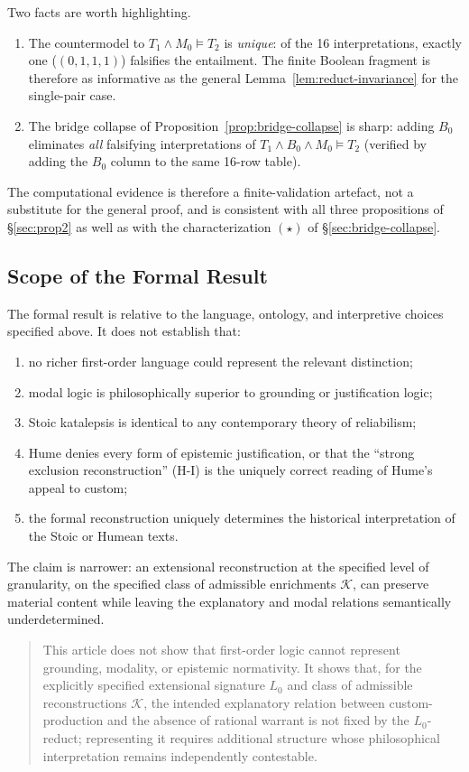 Two facts are worth highlighting.
\begin{enumerate}
\item The countermodel to $T_1\land M_0\models T_2$ is
\emph{unique}: of the 16 interpretations, exactly one
($(0,1,1,1)$) falsifies the entailment. The finite Boolean
fragment is therefore as informative as the general
Lemma~\ref{lem:reduct-invariance} for the single-pair case.
\item The bridge collapse of
Proposition~\ref{prop:bridge-collapse} is sharp: adding $B_0$
eliminates \emph{all} falsifying interpretations of
$T_1\land B_0\land M_0\models T_2$ (verified by adding the
$B_0$ column to the same 16-row table).
\end{enumerate}
The computational evidence is therefore a finite-validation
artefact, not a substitute for the general proof, and is consistent
with all three propositions of \S\ref{sec:prop2} as well as with the
characterization $(\star)$ of
\S\ref{sec:bridge-collapse}.

\subsection{Scope of the Formal Result}
\label{sec:formal-scope}

The formal result is relative to the language, ontology, and
interpretive choices specified above. It does not establish that:
\begin{enumerate}
\item no richer first-order language could represent the relevant
      distinction;
\item modal logic is philosophically superior to grounding or
      justification logic;
\item Stoic katalepsis is identical to any contemporary theory of
      reliabilism;
\item Hume denies every form of epistemic justification, or that
      the ``strong exclusion reconstruction'' (H-I) is the uniquely
      correct reading of Hume's appeal to custom;
\item the formal reconstruction uniquely determines the historical
      interpretation of the Stoic or Humean texts.
\end{enumerate}
The claim is narrower: an extensional reconstruction at the
specified level of granularity, on the specified class of
admissible enrichments $\mathcal K$, can preserve material content
while leaving the explanatory and modal relations semantically
underdetermined.

\begin{quote}
This article does not show that first-order logic cannot represent
grounding, modality, or epistemic normativity. It shows that, for
the explicitly specified extensional signature $L_0$ and class of
admissible reconstructions $\mathcal K$, the intended explanatory
relation between custom-production and the absence of rational
warrant is not fixed by the $L_0$-reduct; representing it requires
additional structure whose philosophical interpretation remains
independently contestable.
\end{quote}
